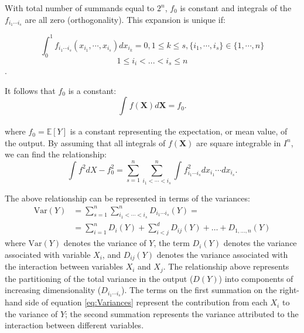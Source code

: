\documentclass[12pt]{article}
\begin{document}
{With total number of summands equal to $2^{n}$, $f_{0}$ is constant and integrals of the $f_{i_{1}\cdots i_{s}}$ are all zero (orthogonality). This expansion is unique if:

\begin{equation}
	\int_{0}^{1}f_{i_{1}\cdots i_{s}}(x_{i_{1}},\cdots,x_{i_{s}})dx_{i_{k}}=0,1\leq k\leq s, \{i_{1},\cdots,i_{s}\}\in\{1,\cdots,n\}
\end{equation}
\[1\leq i_{i}<...<i_{s}\leq n\].

 It follows that $f_{0}$ is a constant:
\begin{equation}
\int^{}_{}f(\mathbf{X})d\mathbf{X}=f_{0}.
\end{equation}

where $f_{0}=\mathbb{E}[Y]$ is a constant representing the expectation, or mean value, of the output.  By assuming that all integrals of $f(\mathbf{X})$ are square integrable in $I^{n}$, we can find the relationship:
\begin{equation}
	\int^{}_{}f^{2}dX-f^{2}_{0}=\sum^{n}_{s=1}\sum^{n}_{i_{1}<\cdots<i_{s}}\int^{}_{}f^{2}_{i_{1}\cdots i_{s}}dx_{i_{1}}\cdots dx_{i_{s}}.
\end{equation}

\vspace{0.5cm}
The above relationship can be represented in terms of the variances:
\begin{equation} \label{eq:Variances}
\begin{split}
\text{Var}(Y) & =\sum^{n}_{s=1}\sum^{n}_{i_{1}<\cdots<i_{s}}D_{i_{1}\cdots i_{s}}(Y)= \\
& = \sum_{i=1}^{n} D_{i}(Y) + \displaystyle\sum_{i<j}^{d} D_{ij}(Y) + \dots + D_{1,\dots,n}(Y)
\end{split}
\end{equation}
where $\text{Var}(Y)$ denotes the variance of $Y$, the term $D_{i}(Y)$ denotes the variance associated with variable $X_{i}$, and $D_{ij}(Y)$ denotes the variance associated with the interaction between variables $X_{i}$ and $X_{j}$. The relationship above represents the partitioning of the total variance in the output ($D(Y)$) into components of increasing dimensionality ($D_{i_{1}\cdots i_{s}}$). The terms on the first summation on the right-hand side of equation \ref{eq:Variances} represent the contribution from each $X_{i}$ to the variance of $Y$; the second summation represents the variance attributed to the interaction between different variables. 

}
\end{document}

